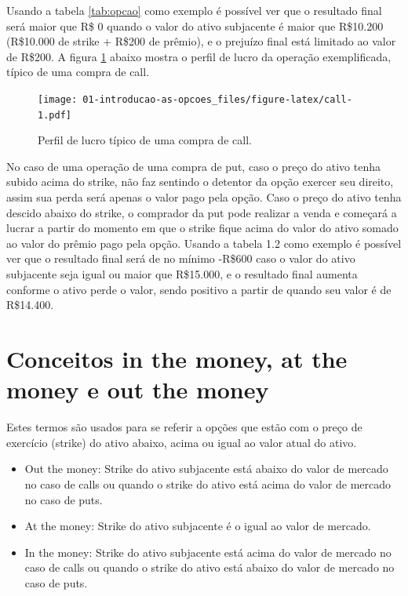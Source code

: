\documentclass[]{book}
\providecommand{\tightlist}{%
  \setlength{\itemsep}{0pt}\setlength{\parskip}{0pt}}
\begin{document}
Usando a tabela \ref{tab:opcao} como exemplo é possível ver que o
resultado final será maior que R\$ 0 quando o valor do ativo subjacente
é maior que R\$10.200 (R\$10.000 de strike + R\$200 de prêmio), e o
prejuízo final está limitado ao valor de R\$200. A figura \ref{fig:call}
abaixo mostra o perfil de lucro da operação exemplificada, típico de uma
compra de call.

\begin{figure}
\centering
\texttt{[image: 01-introducao-as-opcoes\_files/figure-latex/call-1.pdf]}
\caption{\label{fig:call}Perfil de lucro típico de uma compra de call.}
\end{figure}

No caso de uma operação de uma compra de put, caso o preço do ativo
tenha subido acima do strike, não faz sentindo o detentor da opção
exercer seu direito, assim sua perda será apenas o valor pago pela
opção. Caso o preço do ativo tenha descido abaixo do strike, o comprador
da put pode realizar a venda e começará a lucrar a partir do momento em
que o strike fique acima do valor do ativo somado ao valor do prêmio
pago pela opção. Usando a tabela 1.2 como exemplo é possível ver que o
resultado final será de no mínimo -R\$600 caso o valor do ativo
subjacente seja igual ou maior que R\$15.000, e o resultado final
aumenta conforme o ativo perde o valor, sendo positivo a partir de
quando seu valor é de R\$14.400.

\section{Conceitos in the money, at the money e out the
money}\label{conceitos-in-the-money-at-the-money-e-out-the-money}

Estes termos são usados para se referir a opções que estão com o preço
de exercício (strike) do ativo abaixo, acima ou igual ao valor atual do
ativo.

\begin{itemize}
\tightlist
\item
  Out the money: Strike do ativo subjacente está abaixo do valor de
  mercado no caso de calls ou quando o strike do ativo está acima do
  valor de mercado no caso de puts.\\
\item
  At the money: Strike do ativo subjacente é o igual ao valor de
  mercado.
\item
  In the money: Strike do ativo subjacente está acima do valor de
  mercado no caso de calls ou quando o strike do ativo está abaixo do
  valor de mercado no caso de puts.
\end{itemize}
\end{document}
